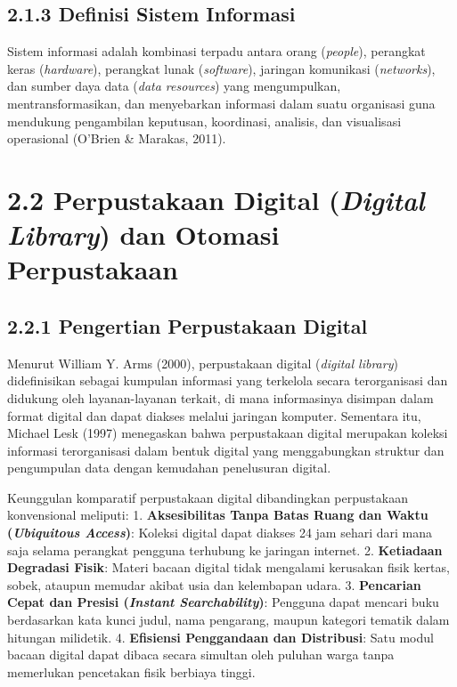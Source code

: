 \documentclass[
  indonesian,
  12pt,
]{report}
\begin{document}
\subsection{2.1.3 Definisi Sistem
Informasi}\label{definisi-sistem-informasi}

Sistem informasi adalah kombinasi terpadu antara orang (\emph{people}),
perangkat keras (\emph{hardware}), perangkat lunak (\emph{software}),
jaringan komunikasi (\emph{networks}), dan sumber daya data (\emph{data
resources}) yang mengumpulkan, mentransformasikan, dan menyebarkan
informasi dalam suatu organisasi guna mendukung pengambilan keputusan,
koordinasi, analisis, dan visualisasi operasional (O'Brien \& Marakas,
2011).

\section{\texorpdfstring{2.2 Perpustakaan Digital (\emph{Digital
Library}) dan Otomasi
Perpustakaan}{2.2 Perpustakaan Digital (Digital Library) dan Otomasi Perpustakaan}}\label{perpustakaan-digital-digital-library-dan-otomasi-perpustakaan}

\subsection{2.2.1 Pengertian Perpustakaan
Digital}\label{pengertian-perpustakaan-digital}

Menurut William Y. Arms (2000), perpustakaan digital (\emph{digital
library}) didefinisikan sebagai kumpulan informasi yang terkelola secara
terorganisasi dan didukung oleh layanan-layanan terkait, di mana
informasinya disimpan dalam format digital dan dapat diakses melalui
jaringan komputer. Sementara itu, Michael Lesk (1997) menegaskan bahwa
perpustakaan digital merupakan koleksi informasi terorganisasi dalam
bentuk digital yang menggabungkan struktur dan pengumpulan data dengan
kemudahan penelusuran digital.

Keunggulan komparatif perpustakaan digital dibandingkan perpustakaan
konvensional meliputi: 1. \textbf{Aksesibilitas Tanpa Batas Ruang dan
Waktu (\emph{Ubiquitous Access})}: Koleksi digital dapat diakses 24 jam
sehari dari mana saja selama perangkat pengguna terhubung ke jaringan
internet. 2. \textbf{Ketiadaan Degradasi Fisik}: Materi bacaan digital
tidak mengalami kerusakan fisik kertas, sobek, ataupun memudar akibat
usia dan kelembapan udara. 3. \textbf{Pencarian Cepat dan Presisi
(\emph{Instant Searchability})}: Pengguna dapat mencari buku berdasarkan
kata kunci judul, nama pengarang, maupun kategori tematik dalam hitungan
milidetik. 4. \textbf{Efisiensi Penggandaan dan Distribusi}: Satu modul
bacaan digital dapat dibaca secara simultan oleh puluhan warga tanpa
memerlukan pencetakan fisik berbiaya tinggi.
\end{document}
